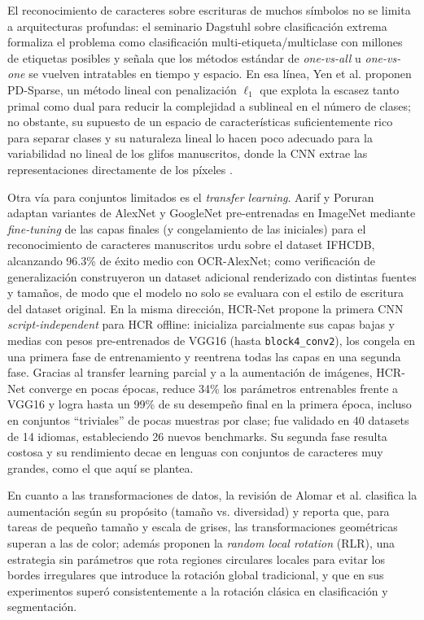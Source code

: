 \documentclass[conference]{IEEEtran}
\begin{document}
El reconocimiento de caracteres sobre escrituras de muchos símbolos no se limita a arquitecturas profundas: el seminario Dagstuhl sobre clasificación extrema \cite{bengio_extreme_2019} formaliza el problema como clasificación multi-etiqueta/multiclase con millones de etiquetas posibles y señala que los métodos estándar de \textit{one-vs-all} u \textit{one-vs-one} se vuelven intratables en tiempo y espacio. En esa línea, Yen et al. \cite{pdsparse_2016} proponen PD-Sparse, un método lineal con penalización $\ell_1$ que explota la escasez tanto primal como dual para reducir la complejidad a sublineal en el número de clases; no obstante, su supuesto de un espacio de características suficientemente rico para separar clases y su naturaleza lineal lo hacen poco adecuado para la variabilidad no lineal de los glifos manuscritos, donde la CNN extrae las representaciones directamente de los píxeles \cite{bangla_cnn_2015}.

Otra vía para conjuntos limitados es el \textit{transfer learning}. Aarif y Poruran \cite{ocrnets_2020} adaptan variantes de AlexNet y GoogleNet pre-entrenadas en ImageNet mediante \textit{fine-tuning} de las capas finales (y congelamiento de las iniciales) para el reconocimiento de caracteres manuscritos urdu sobre el dataset IFHCDB, alcanzando 96.3\% de éxito medio con OCR-AlexNet; como verificación de generalización construyeron un dataset adicional renderizado con distintas fuentes y tamaños, de modo que el modelo no solo se evaluara con el estilo de escritura del dataset original. En la misma dirección, HCR-Net \cite{hcrnet_2024} propone la primera CNN \textit{script-independent} para HCR offline: inicializa parcialmente sus capas bajas y medias con pesos pre-entrenados de VGG16 (hasta \texttt{block4\_conv2}), los congela en una primera fase de entrenamiento y reentrena todas las capas en una segunda fase. Gracias al transfer learning parcial y a la aumentación de imágenes, HCR-Net converge en pocas épocas, reduce 34\% los parámetros entrenables frente a VGG16 y logra hasta un 99\% de su desempeño final en la primera época, incluso en conjuntos ``triviales'' de pocas muestras por clase; fue validado en 40 datasets de 14 idiomas, estableciendo 26 nuevos benchmarks. Su segunda fase resulta costosa y su rendimiento decae en lenguas con conjuntos de caracteres muy grandes, como el que aquí se plantea.

En cuanto a las transformaciones de datos, la revisión de Alomar et al. \cite{alomar_da_2023} clasifica la aumentación según su propósito (tamaño vs. diversidad) y reporta que, para tareas de pequeño tamaño y escala de grises, las transformaciones geométricas superan a las de color; además proponen la \emph{random local rotation} (RLR), una estrategia sin parámetros que rota regiones circulares locales para evitar los bordes irregulares que introduce la rotación global tradicional, y que en sus experimentos superó consistentemente a la rotación clásica en clasificación y segmentación.
\end{document}
